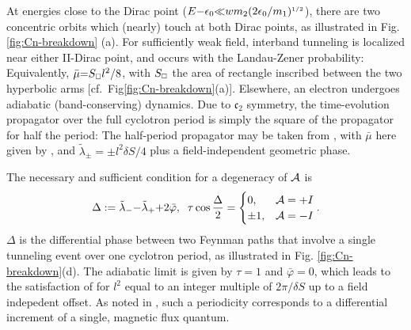 \documentclass[aps, prb, showpacs, twocolumn, notitlepage, superscriptaddress]{revtex4-1}
\begin{document}
At energies close to the Dirac point ($E{-}\epsilon_0 {\ll} wm_2(2\epsilon_0/m_1)^{\scriptscriptstyle{1/2}}$), there are two concentric orbits which (nearly) touch at both Dirac points, as illustrated in Fig. \ref{fig:Cn-breakdown} (a). For sufficiently weak field, interband tunneling is localized near either II-Dirac point, and occurs with the Landau-Zener probability:
Equivalently, $\bar{\mu}{=}S_{\scriptscriptstyle{\square}}l^2/8$, with $S_{\scriptscriptstyle{\square}}$ the area of rectangle inscribed between the two hyperbolic arms [cf.\  Fig\ref{fig:Cn-breakdown}(a)]. Elsewhere, an electron undergoes adiabatic (band-conserving) dynamics. Due to $\mathfrak{c}_2$ symmetry, the time-evolution propagator over the full cyclotron period is simply the square of the propagator for half the period: 
The half-period propagator may be taken from , with  $\bar{\mu}$ here given by , and  $\tilde{\lambda}_{\pm}{=}{\pm}l^2\delta S/4$ plus a field-independent geometric phase.
 






The necessary and sufficient condition for a degeneracy of ${\cal A}$ is 
\begin{align}
\Delta:= \tilde{\lambda}_-{-}\tilde{\lambda}_{+}{+}2\bar{\varphi},\;\;
\tau\cos\frac{\Delta}{2}= \begin{cases} 0, & {{\cal A}}=+I \\
                 \pm 1, & {\cal A} =-I\end{cases}.\label{c2breakdowndgncondition}
\end{align}
$\Delta$ is the differential phase between two Feynman paths  that involve a single tunneling event  over one cyclotron period, as illustrated in Fig. \ref{fig:Cn-breakdown}(d).
The adiabatic limit is given by $\tau{=}1$ and $\bar{\varphi}{=}0$, which leads to the satisfaction of  for $l^2$ equal to an integer multiple of $2\pi/\delta S$ up to a field indepedent offset. As noted in , such a periodicity corresponds to a differential increment of a single, magnetic flux quantum. 
\end{document}
